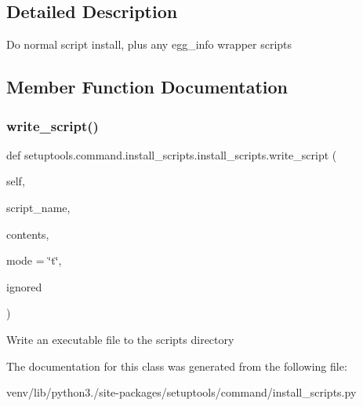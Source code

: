 \subsection{Detailed Description}
\begin{DoxyVerb}Do normal script install, plus any egg_info wrapper scripts\end{DoxyVerb}
 

\subsection{Member Function Documentation}
\mbox{\label{classsetuptools_1_1command_1_1install__scripts_1_1install__scripts_a6adf5034843d12224638090ba6720aac}} 
\subsubsection{\texorpdfstring{write\+\_\+script()}{write\_script()}}
{\footnotesize\ttfamily def setuptools.\+command.\+install\+\_\+scripts.\+install\+\_\+scripts.\+write\+\_\+script (\begin{DoxyParamCaption}\item[{}]{self,  }\item[{}]{script\+\_\+name,  }\item[{}]{contents,  }\item[{}]{mode = {\ttfamily \char`\"{}t\char`\"{}},  }\item[{}]{ignored }\end{DoxyParamCaption})}

\begin{DoxyVerb}Write an executable file to the scripts directory\end{DoxyVerb}
 

The documentation for this class was generated from the following file\+:\begin{DoxyCompactItemize}
\item 
venv/lib/python3./site-\/packages/setuptools/command/install\+\_\+scripts.\+py\end{DoxyCompactItemize}
